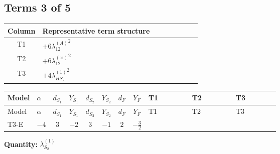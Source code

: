 \documentclass[8pt]{article}
\begin{document}
\begin{landscape}
\subsection*{Terms 3 of 5}
\begin{center}
\begin{tabular}{@{}c >{\raggedright\arraybackslash}p{0.82\linewidth}@{}}
\toprule
Column & Representative term structure \\
\midrule
T1 & \(\displaystyle +6 {\lambda_{12}^{(A)}}^2\) \\
\midrule
T2 & \(\displaystyle +6 {\lambda_{12}^{(\times)}}^2\) \\
\midrule
T3 & \(\displaystyle +4 {\lambda_{HS_2}^{(1)}}^2\) \\
\midrule
\bottomrule
\end{tabular}
\end{center}
\smallskip
\tiny
\begin{longtable}{@{}llcccccc >{\raggedright\arraybackslash}p{0.21\linewidth} >{\raggedright\arraybackslash}p{0.21\linewidth} >{\raggedright\arraybackslash}p{0.21\linewidth}@{}}
\toprule
Model & $\alpha$ & $d_{S_1}$ & $Y_{S_1}$ & $d_{S_2}$ & $Y_{S_2}$ & $d_F$ & $Y_F$ & T1 & T2 & T3 \\
\midrule
\endfirsthead
\toprule
Model & $\alpha$ & $d_{S_1}$ & $Y_{S_1}$ & $d_{S_2}$ & $Y_{S_2}$ & $d_F$ & $Y_F$ & T1 & T2 & T3 \\
\midrule
\endhead
T3-E & $-4$ & $3$ & $-2$ & $3$ & $-1$ & $2$ & $-\frac{3}{2}$ & \scriptsize\adjustbox{max width=\linewidth}{$\begin{gathered} +6 {\lambda_{12}^{(A)}}^2\end{gathered}$} & \scriptsize\adjustbox{max width=\linewidth}{$\begin{gathered} +6 {\lambda_{12}^{(\times)}}^2\end{gathered}$} & \scriptsize\adjustbox{max width=\linewidth}{$\begin{gathered} +4 {\lambda_{HS_2}^{(1)}}^2\end{gathered}$} \\
\midrule
\bottomrule
\end{longtable}
\clearpage
\noindent\textbf{Quantity: }$\lambda_{S_2}^{(1)}$\par\smallskip

\end{landscape}
\end{document}
